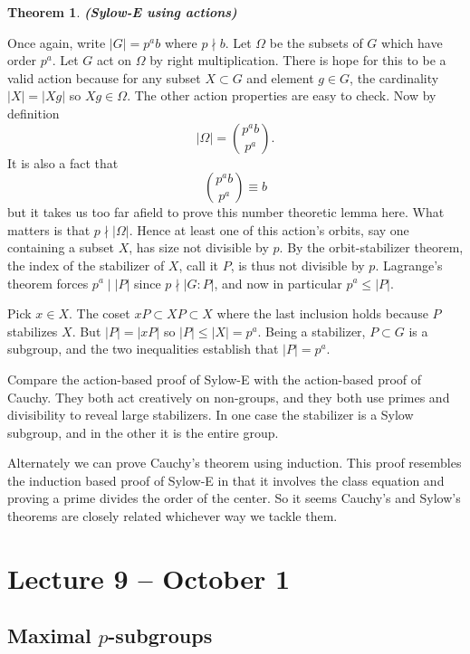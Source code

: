\documentclass[letterpaper]{article}
\newtheorem{theorem}{Theorem}[section]
\newenvironment{proof}[1][Proof]{\begin{trivlist}
\item[\hskip \labelsep {\bfseries #1}]}{\end{trivlist}}
\begin{document}
\begin{theorem}
\emph{\textbf{(Sylow-E using actions)}}
\end{theorem}
\begin{proof}
Once again, write $|G| = p^ab$ where $p \nmid b$. Let $\Omega$ be the subsets of $G$ which have order $p^a$. Let $G$ act on $\Omega$ by right multiplication. There is hope for this to be a valid action because for any subset $X \subset G$ and element $g \in G$, the cardinality $|X| = |Xg|$ so $Xg \in \Omega$. The other action properties are easy to check. Now by definition \[|\Omega| = {p^ab \choose p^a}.\] It is also a fact that \[{p^ab \choose p^a} \equiv b\] but it takes us too far afield to prove this number theoretic lemma here. What matters is that $p \nmid |\Omega|$. Hence at least one of this action's orbits, say one containing a subset $X$, has size not divisible by $p$. By the orbit-stabilizer theorem, the index of the stabilizer of $X$, call it $P$, is thus not divisible by $p$. Lagrange's theorem forces $p^a \mid |P|$ since $p \nmid |G \colon P|$, and now in particular $p^a \leq |P|$.

Pick $x \in X$. The coset $xP \subset XP \subset X$ where the last inclusion holds because $P$ stabilizes $X$. But $|P| = |xP|$ so $|P| \leq |X| = p^a$. Being a stabilizer, $P \subset G$ is a subgroup, and the two inequalities establish that $|P| = p^a$.
\end{proof}

Compare the action-based proof of Sylow-E with the action-based proof of Cauchy. They both act creatively on non-groups, and they both use primes and divisibility to reveal large stabilizers. In one case the stabilizer is a Sylow subgroup, and in the other it is the entire group.

Alternately we can prove Cauchy's theorem using induction. This proof resembles the induction based proof of Sylow-E in that it involves the class equation and proving a prime divides the order of the center. So it seems Cauchy's and Sylow's theorems are closely related whichever way we tackle them.

\section{Lecture 9 -- October 1}

\subsection{Maximal $p$-subgroups}
\end{document}
